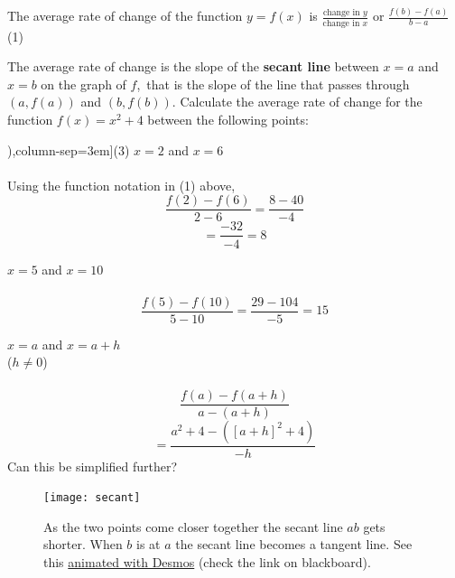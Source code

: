 The average rate of change of the function $\displaystyle y =f (x)$ is $\displaystyle\frac{\text{change in }y}{\text{change in }x}$ or $\displaystyle\frac{f (b) -f (a)}{b -a}$\hfill(1)

The average rate of change is the slope of the \textbf{secant line} between $x =a$ and $x =b$ on the graph of $f$,\ that is the slope of the line that passes through $(a ,f (a))$ and $(b ,f (b))$. 
\clearpage
\example Calculate the average rate of change for the function $f (x) =x^{2} +4$ between the following points:
\begin{tasks}[counter-format=(tsk[1]),column-sep=3em](3)
\task $x =2$ and $x =6$ \\
\solution\\ Using the function notation in (1) above, \[\frac{f(2)-f(6)}{2-6}=\frac{8-40}{-4}\]
\[=\frac{-32}{-4}=8\]

\task $x =5$ and $x =10$ \\
\solution\\
\[\frac{f(5)-f(10)}{5-10}=\frac{29-104}{-5}=15\]

\task $x =a$ and $x =a +h$\\ ($h \neq 0$) \\
\solution\\
\[\frac{f(a)-f(a+h)}{a-(a+h)}\]
\[=\frac{a^2+4-([a+h]^2+4)}{-h}\]
Can this be simplified further?
\end{tasks}
\begin{figure}\begin{center}
\texttt{[image: secant]}
\caption{As the two points come closer together the secant line $ab$ gets shorter. When $b$ is at $a$ the secant line becomes a tangent line. See this \href{https://www.desmos.com/calculator/1zlwbppkuh}{animated with Desmos} (check the link on blackboard).}\end{center}
\end{figure}

